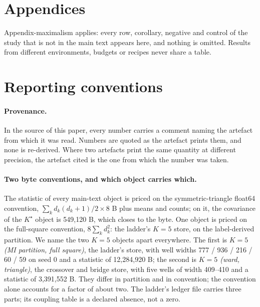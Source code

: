 \documentclass{article} %
\newcommand{\Kstar}{\ensuremath{K^{\star}}}
\begin{document}

\clearpage
\appendix
\section*{Appendices}
Appendix-maximalism applies: every row, corollary, negative and control of the study that is
not in the main text appears here, and nothing is omitted. Results from different
environments, budgets or recipes never share a table.

\section{Reporting conventions}
\label{app:conventions}

\paragraph{Provenance.} In the source of this paper, every number carries a comment naming the
artefact from which it was read. Numbers are quoted as the artefact prints them, and none is
re-derived. Where two artefacts print the same quantity at different precision, the artefact
cited is the one from which the number was taken.

\paragraph{Two byte conventions, and which object carries which.} The statistic of every
main-text object is priced on the symmetric-triangle float64 convention,
$\sum_k d_k(d_k+1)/2\times8$ B plus means and counts; on it, the covariance of the $\Kstar$
object is 549,120 B, which closes to the byte. %
One object is priced on the full-square convention, $8\sum_k d_k^2$: the ladder's $K=5$ store,
on the label-derived partition. We name the two $K=5$ objects apart everywhere. The first is
\emph{$K=5$ (MI partition, full square)}, the ladder's store, with well widths 777 / 936 / 216 / 60 /
59 on seed 0 and a statistic of 12,284,920 B; the second is \emph{$K=5$ (ward, triangle)}, the
crossover and bridge store, with five wells of width 409--410 and a statistic of 3,391,552 B.
They differ in partition and in convention; the convention alone accounts for a factor of about two.
The ladder's ledger file carries three parts; its coupling table is a declared absence, not a
zero. %
\end{document}
